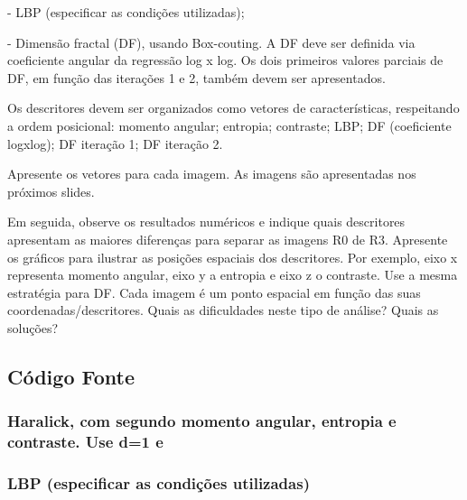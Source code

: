 \documentclass[10pt,a4paper]{article}
\begin{document}
\begin{flushleft}
- LBP (especificar as condições utilizadas);
\end{flushleft}

\begin{flushleft}
- Dimensão fractal (DF), usando Box-couting. A DF deve ser definida via coeficiente angular da regressão log x log. Os dois primeiros valores parciais de DF, em função das iterações 1 e 2, também devem ser apresentados.
\end{flushleft}

\begin{flushleft}
Os descritores devem ser organizados como vetores de características, respeitando a ordem posicional: momento angular; entropia; contraste; LBP; DF (coeficiente logxlog); DF iteração 1; DF iteração 2.
\end{flushleft}

\begin{flushleft}
Apresente os vetores para cada imagem. As imagens são apresentadas nos próximos slides.
\end{flushleft}

\begin{flushleft}
Em seguida, observe os resultados numéricos e indique quais descritores apresentam as maiores diferenças para separar as imagens R0 de R3. Apresente os gráficos para ilustrar as posições espaciais dos descritores. Por exemplo, eixo x representa momento angular, eixo y a entropia e eixo z o contraste. Use a mesma estratégia para DF. Cada imagem é um ponto espacial em função das suas coordenadas/descritores. Quais as dificuldades neste tipo de análise? Quais as soluções?
\end{flushleft}

\subsection{Código Fonte}

\subsubsection{Haralick, com segundo momento angular, entropia e contraste. Use d=1 e }



\subsubsection{LBP (especificar as condições utilizadas)}
\end{document}
